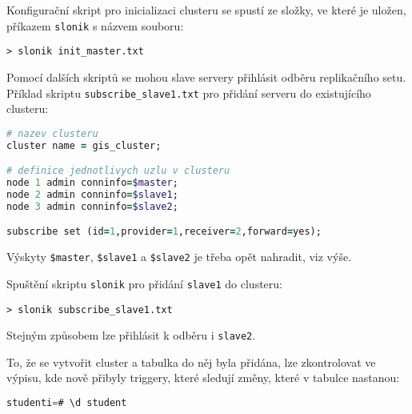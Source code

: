 Konfigurační skript pro inicializaci clusteru se spustí ze složky, ve které je
uložen, příkazem \texttt{slonik} s názvem souboru:

\begin{lstlisting}
> slonik init_master.txt
\end{lstlisting}

Pomocí dalších skriptů se mohou slave servery přihlásit odběru replikačního
setu. Příklad skriptu \texttt{subscribe\_slave1.txt} pro přidání serveru do
existujícího clusteru:
\begin{lstlisting}[language=ruby]
# nazev clusteru
cluster name = gis_cluster;

# definice jednotlivych uzlu v clusteru
node 1 admin conninfo=$master;
node 2 admin conninfo=$slave1;
node 3 admin conninfo=$slave2;

subscribe set (id=1,provider=1,receiver=2,forward=yes);
\end{lstlisting}
Výskyty \texttt{\$master}, \texttt{\$slave1} a \texttt{\$slave2} je třeba opět
nahradit, viz výše.

Spuštění skriptu \texttt{slonik} pro přidání \texttt{slave1} do clusteru:
\begin{lstlisting}
> slonik subscribe_slave1.txt
\end{lstlisting}
Stejným způsobem lze přihlásit k odběru i \texttt{slave2}.

To, že se vytvořit cluster a tabulka do něj byla přidána, lze zkontrolovat ve
výpisu, kde nově přibyly triggery, které sledují změny, které v tabulce
nastanou:

\begin{lstlisting}[language=sql]
studenti=# \d student
\end{lstlisting}

